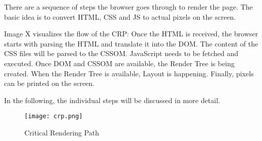 





There are a sequence of steps the browser goes through to render the page.
The basic idea is to convert HTML, CSS and JS to actual pixels on the screen.

Image X visualizes the flow of the CRP:
Once the HTML is received, the browser starts with parsing the HTML and translate it into the DOM.
The content of the CSS files will be parsed to the CSSOM.
JavaScript needs to be fetched and executed.
Once DOM and CSSOM are available, the Render Tree is being created.
When the Render Tree is available, Layout is happening.
Finally, pixels can be printed on the screen.

In the following, the individual steps will be discussed in more detail.


\begin{figure}[h!]
\begin{center}
\texttt{[image: crp.png]}
\caption{Critical Rendering Path}
\label{img:crp}
\end{center}
\end{figure}






